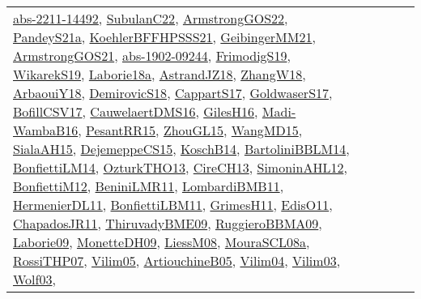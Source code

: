 {\begin{longtable}{lp{3cm}>{\raggedright}p{6cm}>{\raggedright}p{6cm}p{8cm}}
\href{articles/abs-2211-14492.pdf}{abs-2211-14492}\cite{abs-2211-14492}, \href{articles/SubulanC22.pdf}{SubulanC22}\cite{SubulanC22}, \href{papers/ArmstrongGOS22.pdf}{ArmstrongGOS22}\cite{ArmstrongGOS22}, \href{articles/PandeyS21a.pdf}{PandeyS21a}\cite{PandeyS21a}, \href{articles/KoehlerBFFHPSSS21.pdf}{KoehlerBFFHPSSS21}\cite{KoehlerBFFHPSSS21}, \href{papers/GeibingerMM21.pdf}{GeibingerMM21}\cite{GeibingerMM21}, \href{papers/ArmstrongGOS21.pdf}{ArmstrongGOS21}\cite{ArmstrongGOS21}, \href{articles/abs-1902-09244.pdf}{abs-1902-09244}\cite{abs-1902-09244}, \href{papers/FrimodigS19.pdf}{FrimodigS19}\cite{FrimodigS19}, \href{articles/WikarekS19.pdf}{WikarekS19}\cite{WikarekS19}, \href{papers/Laborie18a.pdf}{Laborie18a}\cite{Laborie18a}, \href{papers/AstrandJZ18.pdf}{AstrandJZ18}\cite{AstrandJZ18}, \href{articles/ZhangW18.pdf}{ZhangW18}\cite{ZhangW18}, \href{papers/ArbaouiY18.pdf}{ArbaouiY18}\cite{ArbaouiY18}, \href{papers/DemirovicS18.pdf}{DemirovicS18}\cite{DemirovicS18}, \href{papers/CappartS17.pdf}{CappartS17}\cite{CappartS17}, \href{papers/GoldwaserS17.pdf}{GoldwaserS17}\cite{GoldwaserS17}, \href{papers/BofillCSV17.pdf}{BofillCSV17}\cite{BofillCSV17}, \href{papers/CauwelaertDMS16.pdf}{CauwelaertDMS16}\cite{CauwelaertDMS16}, \href{papers/GilesH16.pdf}{GilesH16}\cite{GilesH16}, \href{papers/Madi-WambaB16.pdf}{Madi-WambaB16}\cite{Madi-WambaB16}, \href{papers/PesantRR15.pdf}{PesantRR15}\cite{PesantRR15}, \href{papers/ZhouGL15.pdf}{ZhouGL15}\cite{ZhouGL15}, \href{articles/WangMD15.pdf}{WangMD15}\cite{WangMD15}, \href{papers/SialaAH15.pdf}{SialaAH15}\cite{SialaAH15}, \href{papers/DejemeppeCS15.pdf}{DejemeppeCS15}\cite{DejemeppeCS15}, \href{papers/KoschB14.pdf}{KoschB14}\cite{KoschB14}, \href{papers/BartoliniBBLM14.pdf}{BartoliniBBLM14}\cite{BartoliniBBLM14}, \href{papers/BonfiettiLM14.pdf}{BonfiettiLM14}\cite{BonfiettiLM14}, \href{articles/OzturkTHO13.pdf}{OzturkTHO13}\cite{OzturkTHO13}, \href{papers/CireCH13.pdf}{CireCH13}\cite{CireCH13}, \href{papers/SimoninAHL12.pdf}{SimoninAHL12}\cite{SimoninAHL12}, \href{papers/BonfiettiM12.pdf}{BonfiettiM12}\cite{BonfiettiM12}, \href{articles/BeniniLMR11.pdf}{BeniniLMR11}\cite{BeniniLMR11}, \href{papers/LombardiBMB11.pdf}{LombardiBMB11}\cite{LombardiBMB11}, \href{papers/HermenierDL11.pdf}{HermenierDL11}\cite{HermenierDL11}, \href{papers/BonfiettiLBM11.pdf}{BonfiettiLBM11}\cite{BonfiettiLBM11}, \href{papers/GrimesH11.pdf}{GrimesH11}\cite{GrimesH11}, \href{papers/EdisO11.pdf}{EdisO11}\cite{EdisO11}, \href{papers/ChapadosJR11.pdf}{ChapadosJR11}\cite{ChapadosJR11}, \href{papers/ThiruvadyBME09.pdf}{ThiruvadyBME09}\cite{ThiruvadyBME09}, \href{articles/RuggieroBBMA09.pdf}{RuggieroBBMA09}\cite{RuggieroBBMA09}, \href{papers/Laborie09.pdf}{Laborie09}\cite{Laborie09}, \href{papers/MonetteDH09.pdf}{MonetteDH09}\cite{MonetteDH09}, \href{articles/LiessM08.pdf}{LiessM08}\cite{LiessM08}, \href{papers/MouraSCL08a.pdf}{MouraSCL08a}\cite{MouraSCL08a}, \href{papers/RossiTHP07.pdf}{RossiTHP07}\cite{RossiTHP07}, \href{papers/Vilim05.pdf}{Vilim05}\cite{Vilim05}, \href{papers/ArtiouchineB05.pdf}{ArtiouchineB05}\cite{ArtiouchineB05}, \href{papers/Vilim04.pdf}{Vilim04}\cite{Vilim04}, \href{papers/Vilim03.pdf}{Vilim03}\cite{Vilim03}, \href{papers/Wolf03.pdf}{Wolf03}\cite{Wolf03}, 
\end{longtable}}
